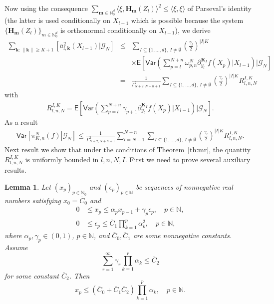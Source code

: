 \documentclass[article]{elsarticle}
\newtheorem{lem}[thm]{Lemma}
\newcommand*{\ol}{\overline}
\begin{document}
Now using the consequence
$\sum_{\mathbf{m}\in \mathbb{N}^d_0} \langle\xi,\mathbf{H}_\mathbf{m}(Z_l)\rangle^2\le\langle\xi,\xi\rangle$
of Parseval's identity
(the latter is used conditionally on $X_{l-1}$
which is possible because the system
$\{\mathbf{H}_\mathbf{m}(Z_l)\}_{m\in \mathbb{N}^d_0}$
is orthonormal conditionally on $X_{l-1}$),
we derive
\begin{eqnarray*}
\sum_{\mathbf{k}\colon\|\mathbf{k}\|\geq K+1}\left[\bar{a}_{l,\mathbf{k}}^{2}(X_{l-1})|\mathcal{G}_{N}\right]
&\leq & \sum_{I\subseteq\{1,\ldots,d\},\, I\neq \emptyset}
\left(\frac{\gamma_{l}}{2}\right)^{|I|K}
\\
&& \times\mathsf E\left[
\mathsf{Var}\left(\sum_{p=l}^{N+n}\omega_{p,n}^{N}\partial_{y_{l}}^{\mathbf{K}_I}f\left(X_{p}\right)
\Big|X_{l-1}\right)
\Bigg|\mathcal G_N\right]
\\
&=& \frac{1}{\Gamma^2_{N+2,N+n+1}}\sum_{I\subseteq\{1,\ldots,d\},\, I\neq \emptyset}
\left(\frac{\gamma_{l}}{2}\right)^{|I|K}
R_{l,n,N}^{I,K}
\end{eqnarray*}
with
\begin{eqnarray*}
R_{l,n,N}^{I,K}=\mathsf E\left[
\mathsf{Var}\left(\sum_{p=l}^{N+n}\gamma_{p+1}\partial_{y_{l}}^{\mathbf{K}_I}f\left(X_{p}\right)
\Big|X_{l-1}\right)
\Bigg|\mathcal G_N\right].
\end{eqnarray*}
As a result
\begin{eqnarray*}
\mathsf{Var}\left[\left.\pi_{K,n}^{N}(f)\right|\mathcal G_N\right]\leq \frac{1}{\Gamma^2_{N+2,N+n+1}}\sum_{l=N+1}^{N+n}\sum_{I\subseteq\{1,\ldots,d\},\, I\neq \emptyset}
\left(\frac{\gamma_{l}}{2}\right)^{|I|K}
R_{l,n,N}^{I,K}.
\end{eqnarray*}
Next result we show that under the conditions  of Theorem~\ref{th:mr}, the quantity \(R_{l,n,N}^{I,K}\) is uniformly bounded in \(l,n,N,I.\) First we need to prove several auxiliary results.
\begin{lem}\label{lem:06062018a1}
Let $(x_p)_{p\in\mathbb N_0}$
and $(\epsilon_p)_{p\in\mathbb N}$
be sequences of nonnegative real numbers
satisfying $x_0=\ol C_0$ and
\begin{align}
0&\le x_p\le\alpha_p x_{p-1}+\gamma_p \epsilon_p,\quad p\in\mathbb N,
\label{eq:06062018a1}\\
0&\le\epsilon_p\le\ol C_1\prod_{k=1}^p \alpha_k^2,\quad p\in\mathbb N,
\label{eq:06062018a2}
\end{align}
where $\alpha_p,\gamma_p\in(0,1)$, $p\in\mathbb N$,
and $\ol C_0,\ol C_1$ are some nonnegative constants. Assume
\begin{equation}\label{eq:06062018a3}
\sum_{r=1}^\infty\gamma_r \prod_{k=1}^r \alpha_k\le\ol C_2
\end{equation}
for some constant $\ol C_2$. Then
$$
x_p\le(\ol C_0+\ol C_1\ol C_2)\prod_{k=1}^p \alpha_k,\quad p\in\mathbb N.
$$
\end{lem}
\end{document}
